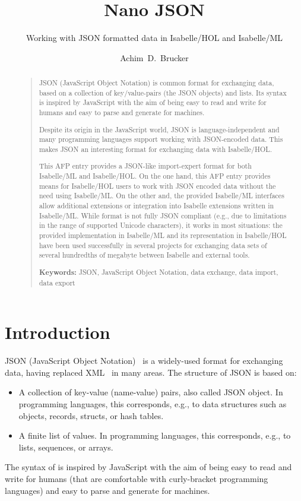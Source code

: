 \documentclass[11pt,DIV=12,a4paper,abstract=true,twoside=semi,openright]
{scrreprt}
\title{Nano JSON}
\subtitle{Working with JSON formatted data in Isabelle/HOL and Isabelle/ML}
\author{Achim~D.~Brucker}%
\begin{document}
  \maketitle
  \begin{abstract}
    \begin{quote}
      JSON (JavaScript Object Notation) is common format for exchanging data,
      based on a collection of key/value-pairs (the JSON objects) and lists. Its
      syntax is inspired by JavaScript with the aim of being easy to read and
      write for humans and easy to parse and generate for machines. 
  
      Despite its origin in the JavaScript world, JSON is language-independent
      and many programming languages support working with JSON-encoded data.
      This makes JSON an interesting format for exchanging data with
      Isabelle/HOL.
 
      This AFP entry provides a JSON-like import-expert format for both
      Isabelle/ML and Isabelle/HOL. On the one hand, this AFP entry provides
      means for Isabelle/HOL users to work with JSON encoded data without the
      need using Isabelle/ML. On the other and, the provided Isabelle/ML
      interfaces allow additional extensions or integration into Isabelle
      extensions written in Isabelle/ML. While format is not fully JSON
      compliant (e.g., due to limitations in the range of supported Unicode
      characters), it works in most situations: the provided implementation in
      Isabelle/ML and its representation in Isabelle/HOL have been used
      successfully in several projects for exchanging data sets of several
      hundredths of megabyte between Isabelle and external tools.

      \bigskip
      \noindent\textbf{Keywords:} JSON, JavaScript Object Notation, data
        exchange, data import, data export 
    \end{quote}
  \end{abstract}
\tableofcontents


\chapter{Introduction}
JSON (JavaScript Object Notation)~\cite{ecma:json:2017,ietf:rfc8259-json:2017}
is a widely-used format for exchanging data, having replaced
XML~\cite{bray.ea:extensible:2008} in many areas. The structure of JSON is based
on:
\begin{itemize}
\item A collection of key-value (name-value) pairs, also called JSON object. In
  programming languages, this corresponds, e.g., to data structures such as
  objects, records, structs, or hash tables. 
\item A finite list of values. In programming languages, this corresponds, e.g.,
  to lists, sequences, or arrays. 
\end{itemize}
The syntax of  is inspired by JavaScript with the aim of being easy to read and
write for humans (that are comfortable with curly-bracket programming languages)
and easy to parse and generate for machines. 
\end{document}
